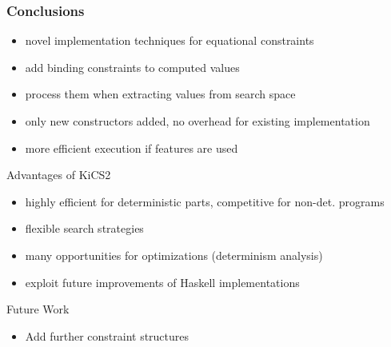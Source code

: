 \documentclass[10pt]{beamer}
\begin{document}
\begin{frame}
\frametitle{Conclusions}
\vspace{-1ex}
\begin{block}{}
\begin{itemize}
\item novel implementation techniques for equational constraints
\item add binding constraints to computed values
\item process them when extracting values from search space
\item only new constructors added, no overhead for existing implementation
\item more efficient execution if features are used
\end{itemize}
\end{block}
\vfill
\begin{block}{Advantages of KiCS2}
\begin{itemize}
\item highly efficient for deterministic parts, competitive for non-det. programs
\item flexible search strategies
\item many opportunities for optimizations (determinism analysis)
\item exploit future improvements of Haskell implementations
\end{itemize}
\end{block}
\vfill
\begin{block}{Future Work}
\begin{itemize}
\item Add further constraint structures
\end{itemize}
\end{block}
\end{frame}
\end{document}
